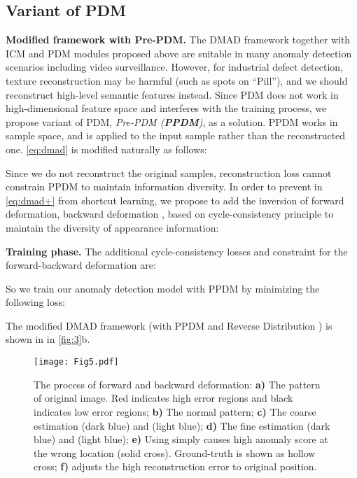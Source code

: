 \documentclass[10pt,twocolumn,letterpaper]{article}
\begin{document}
    \subsection{Variant of PDM}
        \textbf{Modified framework with Pre-PDM.} 
        The DMAD framework together with ICM and PDM modules proposed above are suitable in many anomaly detection scenarios including video surveillance. However, for industrial defect detection, texture reconstruction may be harmful (such as spots on ``Pill''), and we should reconstruct high-level semantic features instead. Since PDM does not work in high-dimensional feature space and interferes with the training process, we propose  variant of PDM, \textit{Pre-PDM (\textbf{PPDM})}, as a solution. PPDM works in sample space, and is applied to the input sample rather than the reconstructed one. \cref{eq:dmad} is modified naturally as follows:
        
        
        Since we do not reconstruct the original samples, reconstruction loss cannot constrain PPDM to maintain information diversity. In order to prevent  in \cref{eq:dmad+} from shortcut learning, we propose to add the inversion of forward deformation, backward deformation , based on cycle-consistency principle to maintain the diversity of appearance information:
        
        
        \textbf{Training phase.}
        The additional cycle-consistency losses  and constraint for the forward-backward deformation  are:
        
        
        So we train our anomaly detection model with PPDM by minimizing the following loss:
        
        The modified DMAD framework (\ie with PPDM and Reverse Distribution \cite{rd}) is shown in in \cref{fig:3}b. 
        
        \begin{figure}
          \centering
          \texttt{[image: Fig5.pdf]}
          \vspace{-0.1em}
          \caption{The process of forward and backward deformation: \textbf{a)} The pattern of original image. Red indicates high error regions and black indicates low error regions; \textbf{b)} The normal pattern; \textbf{c)} The coarse estimation  (dark blue) and  (light blue); \textbf{d)} The fine estimation  (dark blue) and  (light blue); \textbf{e)} Using  simply causes high anomaly score at the wrong location (solid cross). Ground-truth is shown as hollow cross; \textbf{f)}  adjusts the high reconstruction error to original position.}
          \label{fig:5}
        \end{figure}
        
\end{document}
